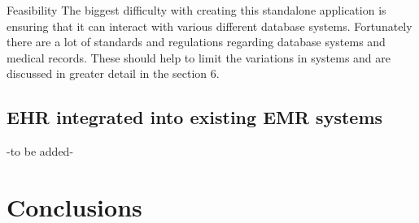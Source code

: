 \documentclass[14pt]{article}
\begin{document}
Feasibility
The biggest difficulty with creating this standalone application is ensuring that it can interact with various different database systems. Fortunately there are a lot of standards and regulations regarding database systems and medical records. These should help to limit the variations in systems and are discussed in greater detail in the section 6. 

\subsection{EHR integrated into existing EMR systems}
-to be added-

\newpage

\section{Conclusions}
\label{sec:Conclusions}

\newpage

\begin{appendix}


\end{appendix}

\newpage

 
 
\end{document}
